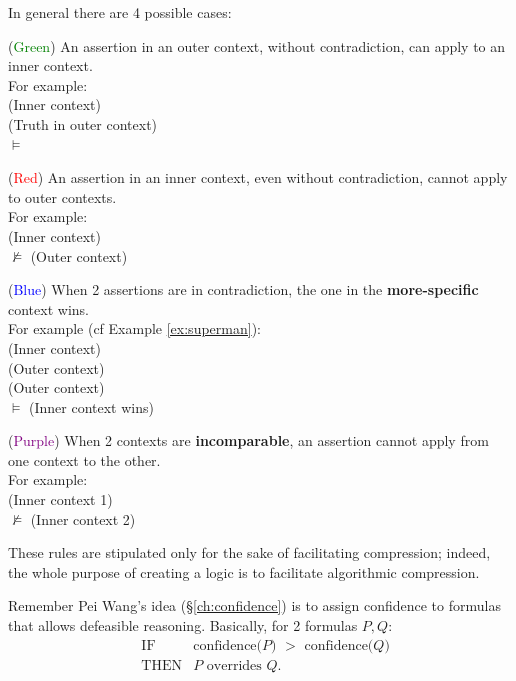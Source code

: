 In general there are 4 possible cases:
\begin{enumerate-}
\item (\textcolor{Green}{Green}) An assertion in an outer context, without contradiction, can apply to an inner context.\\
      For example:\\
        (Inner context)\\
        (Truth in outer context)\\
      $\models$ 
\item (\textcolor{Red}{Red}) An assertion in an inner context, even without contradiction, cannot apply to outer contexts.\\
      For example:\\
        (Inner context)\\
      $\not\models$   (Outer context)
\item (\textcolor{Blue}{Blue}) When 2 assertions are in contradiction, the one in the \textbf{more-specific} context wins.\\
      For example (cf Example \ref{ex:superman}):\\
        (Inner context)\\
        (Outer context)\\
        (Outer context)\\
      $\models$  (Inner context wins)
\item (\textcolor{Purple}{Purple}) When 2 contexts are \textbf{incomparable}, an assertion cannot apply from one context to the other.\\
      For example:\\
        (Inner context 1)\\
      $\not\models$   (Inner context 2)
\end{enumerate-}

These rules are stipulated only for the sake of facilitating compression;  indeed, the whole purpose of creating a logic is to facilitate algorithmic compression.

Remember Pei Wang's idea (\S\ref{ch:confidence}) is to assign confidence to formulas that allows defeasible reasoning.  Basically, for 2 formulas $P, Q$:
\begin{eqnarray}
& \mbox{IF} & \mbox{confidence($P$) $>$ confidence($Q$)} \nonumber\\
& \mbox{THEN} & \mbox{$P$ overrides $Q$}. \nonumber
\end{eqnarray}

